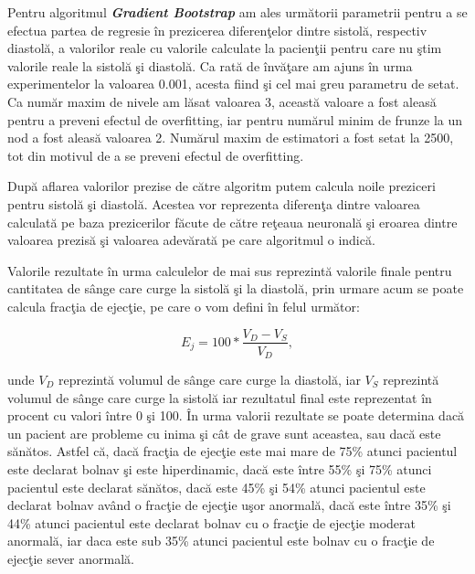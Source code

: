 Pentru algoritmul \textbf{\textit{Gradient Bootstrap}} am ales urm\u{a}torii parametrii pentru a se efectua partea de regresie \^{i}n prezicerea diferen\c{t}elor dintre sistol\u{a}, respectiv diastol\u{a}, a valorilor reale cu valorile calculate la pacien\c{t}ii pentru care nu \c{s}tim valorile reale la sistol\u{a} \c{s}i diastol\u{a}. Ca rat\u{a} de \^{i}nv\u{a}\c{t}are am ajuns \^{i}n urma experimentelor la valoarea 0.001, acesta fiind \c{s}i cel mai greu parametru de setat. Ca num\u{a}r maxim de nivele am l\u{a}sat valoarea 3, aceast\u{a} valoare a fost aleas\u{a} pentru a preveni efectul de overfitting, iar pentru num\u{a}rul minim de frunze la un nod a fost aleas\u{a} valoarea 2. Num\u{a}rul maxim de estimatori a fost setat la 2500, tot din motivul de a se preveni efectul de overfitting.

\par

Dup\u{a} aflarea valorilor prezise de c\u{a}tre algoritm putem calcula noile preziceri pentru sistol\u{a} \c{s}i diastol\u{a}. Acestea vor reprezenta diferen\c{t}a dintre valoarea calculat\u{a} pe baza prezicerilor f\u{a}cute de c\u{a}tre re\c{t}eaua neuronal\u{a} \c{s}i eroarea dintre valoarea prezis\u{a} \c{s}i valoarea adev\u{a}rat\u{a} pe care algoritmul o indic\u{a}. 

\par

Valorile rezultate \^{i}n urma calculelor de mai sus reprezint\u{a} valorile finale pentru cantitatea de s\^{a}nge care curge la sistol\u{a} \c{s}i la diastol\u{a}, prin urmare acum se poate calcula frac\c{t}ia de ejec\c{t}ie, pe care o vom defini \^{i}n felul urm\u{a}tor:

$$ E_j = 100 * \frac{V_D - V_S}{V_D}, $$

unde $V_D$ reprezint\u{a} volumul de s\^{a}nge care curge la diastol\u{a}, iar $V_S$ reprezint\u{a} volumul de s\^{a}nge care curge la sistol\u{a} iar rezultatul final este reprezentat \^{i}n procent cu valori \^{i}ntre 0 \c{s}i 100. \^{I}n urma valorii rezultate se poate determina dac\u{a} un pacient are probleme cu inima \c{s}i c\^{a}t de grave sunt aceastea, sau dac\u{a} este s\u{a}n\u{a}tos. Astfel c\u{a}, dac\u{a} frac\c{t}ia de ejec\c{t}ie este mai mare de 75\% atunci pacientul este declarat bolnav \c{s}i este hiperdinamic, dac\u{a} este \^{i}ntre 55\% \c{s}i 75\% atunci pacientul este declarat s\u{a}n\u{a}tos, dac\u{a} este 45\% \c{s}i 54\% atunci pacientul este declarat bolnav av\^{a}nd o frac\c{t}ie de ejec\c{t}ie u\c{s}or anormal\u{a}, dac\u{a} este \^{i}ntre 35\% \c{s}i 44\% atunci pacientul este declarat bolnav cu o frac\c{t}ie de ejec\c{t}ie moderat anormal\u{a}, iar daca este sub 35\% atunci pacientul este bolnav cu o frac\c{t}ie de ejec\c{t}ie sever anormal\u{a}.

